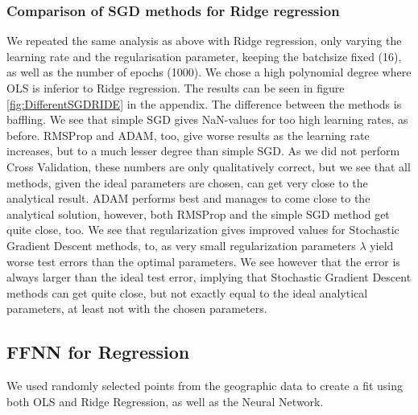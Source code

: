 \documentclass[11pt,a4paper,titlepage]{article}
\begin{document}
\subsubsection{Comparison of SGD methods for Ridge regression}
We repeated the same analysis as above with Ridge regression, only varying the learning rate and the regularisation parameter, keeping the batchsize fixed (16), as well as the number of epochs (1000). We chose a high polynomial degree where OLS is inferior to Ridge regression. The results can be seen in figure \ref{fig:DifferentSGDRIDE} in the appendix. The difference between the methods is baffling. We see that simple SGD gives NaN-values for too high learning rates, as before. RMSProp and ADAM, too, give worse results as the learning rate increases, but to a much lesser degree than simple SGD. As we did not perform Cross Validation, these numbers are only qualitatively correct, but we see that all methods, given the ideal parameters are chosen, can get very close to the analytical result. ADAM performs best and manages to come close to the analytical solution, however, both RMSProp and the simple SGD method get quite close, too. We see that regularization gives improved values for Stochastic Gradient Descent methods, to, as very small regularization parameters $\lambda$ yield worse test errors than the optimal parameters. We see however that the error is always larger than the ideal test error, implying that Stochastic Gradient Descent methods can get quite close, but not exactly equal to the ideal analytical parameters, at least not with the chosen parameters. 
\subsection{FFNN for Regression}
We used randomly selected points from the geographic data \citep{Project1} to create a fit using both OLS and Ridge Regression, as well as the Neural Network.
\end{document}
